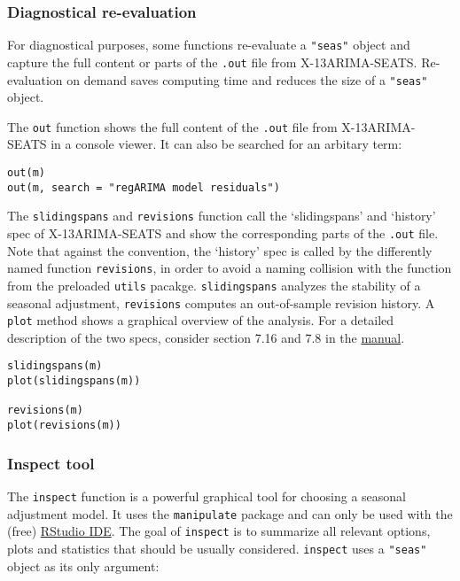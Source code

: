 \subsubsection{Diagnostical
re-evaluation}\label{diagnostical-re-evaluation}

For diagnostical purposes, some functions re-evaluate a \texttt{"seas"}
object and capture the full content or parts of the \texttt{.out} file
from X-13ARIMA-SEATS. Re-evaluation on demand saves computing time and
reduces the size of a \texttt{"seas"} object.

The \texttt{out} function shows the full content of the \texttt{.out}
file from X-13ARIMA-SEATS in a console viewer. It can also be searched
for an arbitary term:

\begin{verbatim}
out(m)
out(m, search = "regARIMA model residuals")
\end{verbatim}

The \texttt{slidingspans} and \texttt{revisions} function call the
`slidingspans' and `history' spec of X-13ARIMA-SEATS and show the
corresponding parts of the \texttt{.out} file. Note that against the
convention, the `history' spec is called by the differently named
function \texttt{revisions}, in order to avoid a naming collision with
the function from the preloaded \texttt{utils} pacakge.
\texttt{slidingspans} analyzes the stability of a seasonal adjustment,
\texttt{revisions} computes an out-of-sample revision history. A
\texttt{plot} method shows a graphical overview of the analysis. For a
detailed description of the two specs, consider section 7.16 and 7.8 in
the \href{http://www.census.gov/ts/x13as/docX13AS.pdf}{manual}.

\begin{verbatim}
slidingspans(m)
plot(slidingspans(m))

revisions(m)
plot(revisions(m))
\end{verbatim}

\subsubsection{Inspect tool}\label{inspect-tool}

The \texttt{inspect} function is a powerful graphical tool for choosing
a seasonal adjustment model. It uses the \texttt{manipulate} package and
can only be used with the (free)
\href{http://www.rstudio.com/ide/}{RStudio IDE}. The goal of
\texttt{inspect} is to summarize all relevant options, plots and
statistics that should be usually considered. \texttt{inspect} uses a
\texttt{"seas"} object as its only argument:

